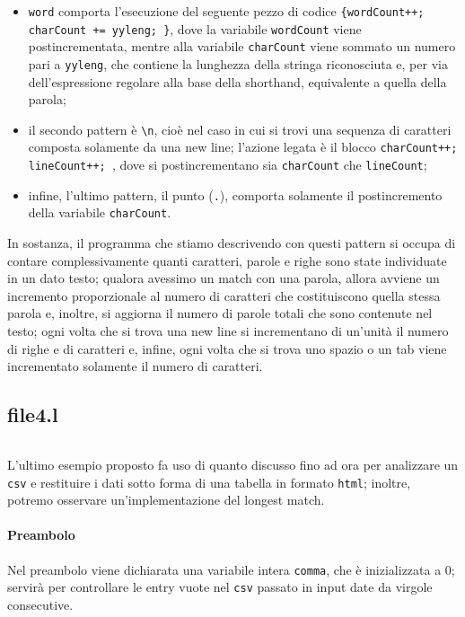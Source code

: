 \documentclass[class=book, crop=false, oneside, 12pt]{standalone}
\begin{document}
\begin{itemize}
    \item \texttt{word} comporta l'esecuzione del seguente pezzo di codice \texttt{\{wordCount++; charCount += yyleng; \}}, dove la variabile \texttt{wordCount} viene postincrementata, mentre alla variabile \texttt{charCount} viene sommato un numero pari a \texttt{yyleng}, che contiene la lunghezza della stringa riconosciuta e, per via dell'espressione regolare alla base della shorthand, equivalente a quella della parola;
    \item il secondo pattern è \texttt{\textbackslash n}, cioè nel caso in cui si trovi una sequenza di caratteri composta solamente da una new line; l'azione legata è il blocco \texttt{{charCount++; lineCount++; }}, dove si postincrementano sia \texttt{charCount} che \texttt{lineCount};
    \item infine, l'ultimo pattern, il punto (\texttt{.}), comporta solamente il postincremento della variabile \texttt{charCount}.
\end{itemize}

In sostanza, il programma che stiamo descrivendo con questi pattern si occupa di contare complessivamente quanti caratteri, parole e righe sono state individuate in un dato testo; qualora avessimo un match con una parola, allora avviene un incremento proporzionale al numero di caratteri che costituiscono quella stessa parola e, inoltre, si aggiorna il numero di parole totali che sono contenute nel testo; ogni volta che si trova una new line si incrementano di un'unità il numero di righe e di caratteri e, infine, ogni volta che si trova uno spazio o un tab viene incrementato solamente il numero di caratteri. 

\subsection*{file4.l} 

\inputminted[linenos, breaklines, tabsize = 2, fontsize = \small]{c}{assets/code-fragments/file4.l}

\noindent L'ultimo esempio proposto fa uso di quanto discusso fino ad ora per analizzare un \texttt{csv} e restituire i dati sotto forma di una tabella in formato \texttt{html}; inoltre, potremo osservare un'implementazione del longest match.

\paragraph{Preambolo}
Nel preambolo viene dichiarata una variabile intera \texttt{comma}, che è inizializzata a \(0\); servirà per controllare le entry vuote nel \texttt{csv} passato in input date da virgole consecutive.
\end{document}
